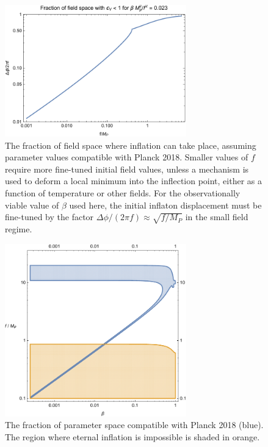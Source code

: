 \documentclass[aps,amsfonts,amsmath,prd,preprint,nofootinbib,superscriptaddress]{revtex4}
\newcommand{\Mp}{{M_{P}}}
\begin{document}
\begin{figure}[!h]
  \centering
    \includegraphics[width=0.7\textwidth]{figures/SRfraction.pdf}
    \caption{The fraction of field space where inflation can take place, assuming parameter values compatible with Planck 2018.  Smaller values of $f$ require more fine-tuned initial field values, unless a 
    mechanism is used to deform a local minimum into the inflection point, either
    as a function of temperature or other fields.  For the observationally viable value of $\beta$ used here, the initial inflaton displacement must be fine-tuned by the factor $\Delta\phi/(2\pi f) \approx \sqrt{f/\Mp}$ in the small field regime.}
\end{figure}



\begin{figure}[!h]
  \centering
    \includegraphics[width=0.7\textwidth]{figures/fbregionPlanck2018.pdf}
    \caption{The fraction of parameter space compatible with Planck 2018 (blue).  The region where eternal inflation is impossible is shaded in orange.}
\end{figure}
\end{document}
